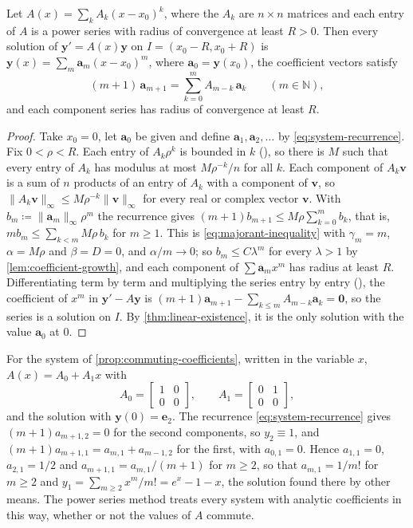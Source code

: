 \begin{proposition}
\label{prop:analytic-systems}
Let $A(x)=\sum_kA_k(x-x_0)^k$, where the $A_k$ are $n\times n$ matrices and each entry of $A$ is a power series with radius of convergence at least $R>0$. Then every solution of $\mathbf y'=A(x)\mathbf y$ on $I=(x_0-R,x_0+R)$ is $\mathbf y(x)=\sum_m\mathbf a_m(x-x_0)^m$, where $\mathbf a_0=\mathbf y(x_0)$, the coefficient vectors satisfy
\begin{equation}
(m+1)\,\mathbf a_{m+1}=\sum_{k=0}^mA_{m-k}\,\mathbf a_k\qquad(m\in\mathbb N),
\label{eq:system-recurrence}
\end{equation}
and each component series has radius of convergence at least $R$.
\end{proposition}

\begin{proof}
Take $x_0=0$, let $\mathbf a_0$ be given and define $\mathbf a_1,\mathbf a_2,\ldots$ by \eqref{eq:system-recurrence}. Fix $0<\rho<R$. Each entry of $A_k\rho^k$ is bounded in $k$ (), so there is $M$ such that every entry of $A_k$ has modulus at most $M\rho^{-k}/n$ for all $k$. Each component of $A_k\mathbf v$ is a sum of $n$ products of an entry of $A_k$ with a component of $\mathbf v$, so $\|A_k\mathbf v\|_\infty\le M\rho^{-k}\|\mathbf v\|_\infty$ for every real or complex vector $\mathbf v$. With $b_m\coloneqq\|\mathbf a_m\|_\infty\rho^m$ the recurrence gives $(m+1)b_{m+1}\le M\rho\sum_{k=0}^mb_k$, that is, $mb_m\le\sum_{k<m}M\rho\,b_k$ for $m\ge1$. This is \eqref{eq:majorant-inequality} with $\gamma_m=m$, $\alpha=M\rho$ and $\beta=D=0$, and $\alpha/m\to0$; so $b_m\le C\lambda^m$ for every $\lambda>1$ by \cref{lem:coefficient-growth}, and each component of $\sum\mathbf a_mx^m$ has radius at least $R$. Differentiating term by term and multiplying the series entry by entry (), the coefficient of $x^m$ in $\mathbf y'-A\mathbf y$ is $(m+1)\mathbf a_{m+1}-\sum_{k\le m}A_{m-k}\mathbf a_k=\mathbf 0$, so the series is a solution on $I$. By \cref{thm:linear-existence}, it is the only solution with the value $\mathbf a_0$ at $0$.
\end{proof}

For the system of \cref{prop:commuting-coefficients}, written in the variable $x$, $A(x)=A_0+A_1x$ with
\[
A_0=\begin{bmatrix}1&0\\0&0\end{bmatrix},\qquad A_1=\begin{bmatrix}0&1\\0&0\end{bmatrix},
\]
and the solution with $\mathbf y(0)=\mathbf e_2$. The recurrence \eqref{eq:system-recurrence} gives $(m+1)a_{m+1,2}=0$ for the second components, so $y_2\equiv1$, and $(m+1)a_{m+1,1}=a_{m,1}+a_{m-1,2}$ for the first, with $a_{0,1}=0$. Hence $a_{1,1}=0$, $a_{2,1}=1/2$ and $a_{m+1,1}=a_{m,1}/(m+1)$ for $m\ge2$, so that $a_{m,1}=1/m!$ for $m\ge2$ and $y_1=\sum_{m\ge2}x^m/m!=e^x-1-x$, the solution found there by other means. The power series method treats every system with analytic coefficients in this way, whether or not the values of $A$ commute.

